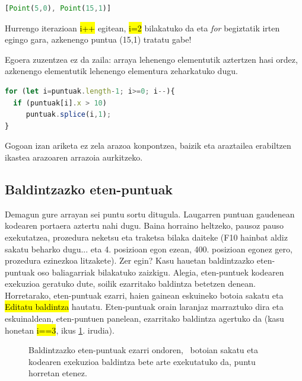  \begin{lstlisting}[language=JavaScript,numbers=none]
 [Point(5,0), Point(15,1)]
 \end{lstlisting}

Hurrengo iterazioan \hl{i++} egitean, \hl{i=2} bilakatuko da eta \textit{for} begiztatik irten egingo gara, azkenengo puntua (15,1) tratatu gabe!

Egoera zuzentzea ez da zaila: arraya lehenengo elementutik aztertzen hasi ordez, azkenengo elementutik lehenengo elementura zeharkatuko dugu.

\begin{lstlisting}[language=JavaScript,numbers=none]
for (let i=puntuak.length-1; i>=0; i--){
  if (puntuak[i].x > 10)
     puntuak.splice(i,1);
}
\end{lstlisting}

Gogoan izan ariketa ez zela arazoa konpontzea, baizik eta araztailea erabiltzen ikastea arazoaren arrazoia aurkitzeko.

\subsection{Baldintzazko eten-puntuak}

Demagun gure arrayan sei puntu sortu ditugula. Laugarren puntuan gaudenean kodearen portaera aztertu nahi dugu. Baina horraino heltzeko, pausoz pauso exekutatzea, prozedura neketsu eta traketsa bilaka daiteke (F10 hainbat aldiz sakatu beharko dugu... eta 4. posizioan egon ezean, 400. posizioan egonez gero, prozedura ezinezkoa litzakete). Zer egin? Kasu hauetan baldintzazko eten-puntuak oso baliagarriak bilakatuko zaizkigu. Alegia, eten-puntuek kodearen exekuzioa geratuko dute, soilik ezarritako baldintza betetzen denean. Horretarako, eten-puntuak ezarri, haien gainean eskuineko botoia sakatu eta \hl{Editatu baldintza} hautatu. Eten-puntuak orain laranjaz marraztuko dira eta eskuinaldean, eten-puntuen panelean, ezarritako baldintza agertuko da (kasu honetan \hl{i==3}, ikus \ref{fig:araztaile7}. irudia).

\begin{figure}[ht]
	\centering
{}
\caption{Baldintzazko eten-puntuak ezarri ondoren, \faPlay \, botoian sakatu eta kodearen exekuzioa baldintza bete arte exekutatuko da, puntu horretan etenez.}
\label{fig:araztaile7} 
\end{figure}

